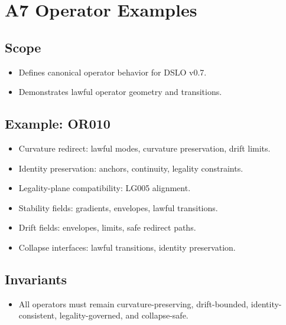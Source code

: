 \section{A7 Operator Examples}

\subsection{Scope}
\begin{itemize}
    \item Defines canonical operator behavior for DSLO v0.7.
    \item Demonstrates lawful operator geometry and transitions.
\end{itemize}

\subsection{Example: OR010}
\begin{itemize}
    \item Curvature redirect: lawful modes, curvature preservation, drift limits.
    \item Identity preservation: anchors, continuity, legality constraints.
    \item Legality-plane compatibility: LG005 alignment.
    \item Stability fields: gradients, envelopes, lawful transitions.
    \item Drift fields: envelopes, limits, safe redirect paths.
    \item Collapse interfaces: lawful transitions, identity preservation.
\end{itemize}

\subsection{Invariants}
\begin{itemize}
    \item All operators must remain curvature-preserving, drift-bounded, identity-consistent, legality-governed, and collapse-safe.
\end{itemize}
